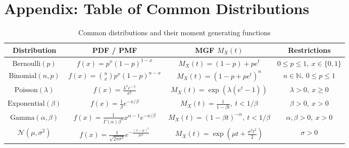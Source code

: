 \section{Appendix: Table of Common Distributions}\label{s:app_common_distributions}
\begin{table}[ht]
\renewcommand{\arraystretch}{1.5}
\begin{adjustwidth}{-.5in}{-.5in}
\begin{center}
    
\begin{tabular}{|c|c|c|c|}
\hline
\textbf{Distribution} & \textbf{PDF / PMF} & \textbf{MGF \(M_X(t)\)} & \textbf{Restrictions} \\
\hline

\( \text{Bernoulli}(p) \) & \(\displaystyle  f(x) = p^x(1-p)^{1-x} \) & \( M_X(t) = (1 - p) + pe^t \) & \( 0 \leq p \leq 1,\ x \in \{0,1\} \) \\
\hline

\( \text{Binomial}(n, p) \) & \( \displaystyle f(x) = \binom{n}{x} p^x (1-p)^{n-x} \) & \( M_X(t) = (1 - p + pe^t)^n \) & \( n \in \mathbb{N},\ 0 \leq p \leq 1 \) \\
\hline

\( \text{Poisson}(\lambda) \) & \( \displaystyle f(x) = \frac{\lambda^x e^{-\lambda}}{x!} \) & \( M_X(t) = \exp(\lambda(e^t - 1)) \) & \( \lambda > 0,\ x \geq 0 \) \\
\hline

\( \text{Exponential}(\beta) \) & \( \displaystyle f(x) = \frac{1}{\beta} e^{-x/\beta} \) & \( M_X(t) = \frac{1}{1 - \beta t},\ t < 1/\beta \) & \( \beta > 0,\ x > 0 \) \\
\hline

\( \text{Gamma}(\alpha, \beta) \) & \( \displaystyle f(x) = \frac{1}{\Gamma(\alpha)\beta^\alpha} x^{\alpha-1} e^{-x/\beta} \) & \( M_X(t) = (1 - \beta t)^{-\alpha},\ t < 1/\beta \) & \( \alpha, \beta > 0,\ x > 0 \) \\
\hline

\( \mathcal{N}(\mu, \sigma^2) \) & \( \displaystyle f(x) = \frac{1}{\sqrt{2\pi \sigma^2}} e^{-\frac{(x - \mu)^2}{2\sigma^2}} \) & \( M_X(t) = \exp\left( \mu t + \frac{\sigma^2 t^2}{2} \right) \) & \( \sigma > 0 \) \\
\hline

\end{tabular}
\end{center}
\end{adjustwidth}
\caption{Common distributions and their moment generating functions}
\label{t:MGFs_common}
\end{table}
